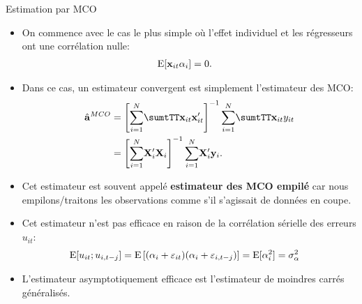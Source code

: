 \begin{frame}[allowframebreaks]{Estimation par MCO}
\begin{itemize}
    \item On commence avec le cas le plus simple où l'effet individuel 
    et les régresseurs ont une corrélation nulle:
    \begin{align*}
        \operatorname{E}[{\mathbf x}_{it}\alpha_i] &= 0.
    \end{align*}
    \item Dans ce cas, un estimateur convergent est simplement l'estimateur des MCO:
    \begin{align*}
    \hat{\bolda}^{MCO} &= \left[\sumiN\sumtTT \boldx_{it}\boldx_{it}^\prime\right]^{-1}\sumiN\sumtTT \boldx_{it}y_{it}\\
               &= \left[\sumiN \boldX_i^\prime \boldX_i\right]^{-1}\sumiN \boldX_i^\prime \boldy_i.
    \end{align*}
    \item Cet estimateur est souvent appelé \textbf{estimateur des MCO empilé} car nous empilons/traitons
     les observations comme s'il s'agissait de données en coupe.
     \item Cet estimateur n'est pas efficace en raison de la corrélation sérielle des erreurs $u_{it}$:
     \begin{align*}
        \operatorname{E}[u_{it}; u_{i, t-j}] &= \operatorname{E}\left[(\alpha_i + \varepsilon_{it})(\alpha_i + \varepsilon_{i, t-j})\right] = \operatorname{E}[\alpha_i^2] =\sigma_\alpha^2
    \end{align*}
    \item L'estimateur asymptotiquement efficace est l'estimateur de moindres carrés généralisés.
\end{itemize}
\end{frame}

